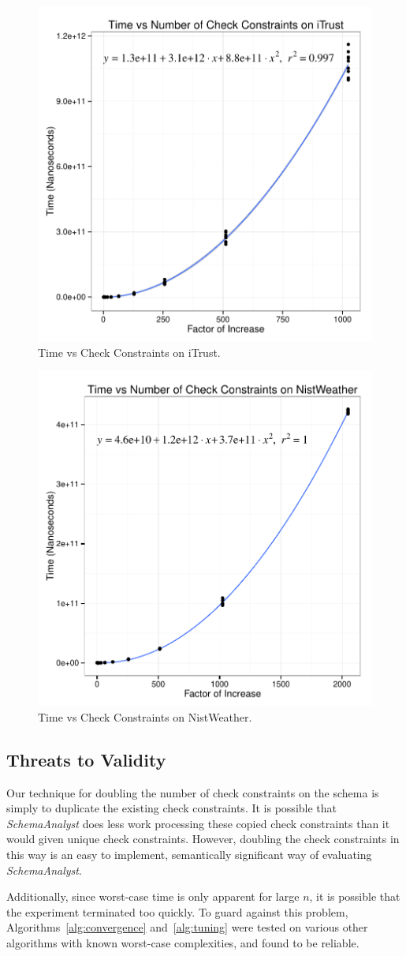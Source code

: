 \documentclass[smallextended]{svjour3}       %
\begin{document}
\begin{figure}
\centering
  \centering
  \includegraphics[width=.5\linewidth]{iTrustChecks.pdf}
  \caption{Time vs Check Constraints on iTrust.}
  \label{fig:iTrust}
\end{figure}
\begin{figure}
  \centering
  \includegraphics[width=.5\linewidth]{NistWeatherChecks.pdf}
  \caption{Time vs Check Constraints on NistWeather.}
  \label{fig:NistWeather}
\end{figure}

\subsection*{Threats to Validity}
Our technique for doubling the number of check constraints on the schema
is simply to duplicate the existing check constraints. It is possible
that \textit{SchemaAnalyst} does less work processing these copied check
constraints than it would given unique check constraints. However,
doubling the check constraints in this way is an easy to implement,
semantically significant way of evaluating \textit{SchemaAnalyst}.

Additionally, since worst-case time is only apparent for large $n$, 
it is possible that the experiment terminated too quickly.  To guard 
against this problem, Algorithms~\ref{alg:convergence} and~\ref{alg:tuning}
were tested on various other algorithms with known worst-case complexities, and 
found to be reliable.
\end{document}
